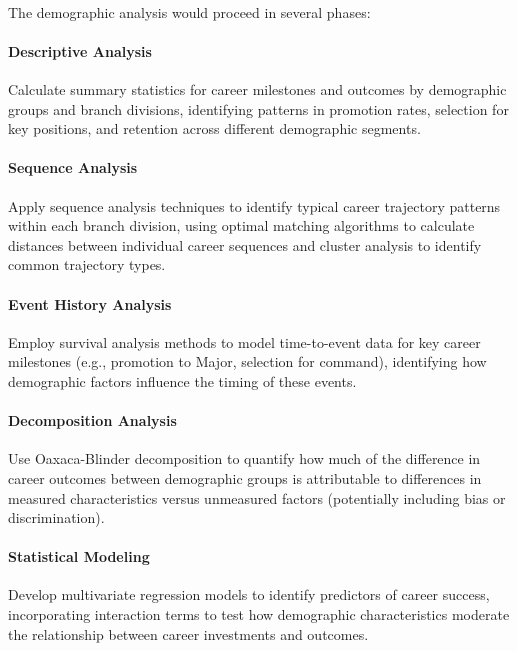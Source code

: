 \documentclass[../main.tex]{subfiles}
\begin{document}

\paragraph{} The demographic analysis would proceed in several phases:

\paragraph{Descriptive Analysis} Calculate summary statistics for career milestones and outcomes by demographic groups and branch divisions, identifying patterns in promotion rates, selection for key positions, and retention across different demographic segments.

\paragraph{Sequence Analysis} Apply sequence analysis techniques to identify typical career trajectory patterns within each branch division, using optimal matching algorithms to calculate distances between individual career sequences and cluster analysis to identify common trajectory types.

\paragraph{Event History Analysis} Employ survival analysis methods to model time-to-event data for key career milestones (e.g., promotion to Major, selection for command), identifying how demographic factors influence the timing of these events.

\paragraph{Decomposition Analysis} Use Oaxaca-Blinder decomposition to quantify how much of the difference in career outcomes between demographic groups is attributable to differences in measured characteristics versus unmeasured factors (potentially including bias or discrimination).

\paragraph{Statistical Modeling} Develop multivariate regression models to identify predictors of career success, incorporating interaction terms to test how demographic characteristics moderate the relationship between career investments and outcomes.
\end{document}
